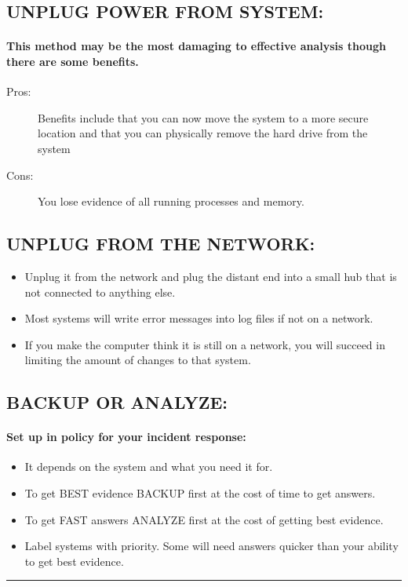 \documentclass[10pt,british,english]{article}
\begin{document}
\subsection{UNPLUG POWER FROM SYSTEM:}

\paragraph{This method may be the most damaging to effective analysis though
there are some benefits.}
\begin{description}
\item [{Pros:}] Benefits include that you can now move the system to a
more secure location and that you can physically remove the hard drive
from the system
\item [{Cons:}] You lose evidence of all running processes and memory.
\end{description}
%

\subsection{UNPLUG FROM THE NETWORK:}
\begin{itemize}
\item Unplug it from the network and plug the distant end into a small hub
that is not connected to anything else.
\item Most systems will write error messages into log files if not on a
network. 
\item If you make the computer think it is still on a network, you will
succeed in limiting the amount of changes to that system.
\end{itemize}

\subsection{BACKUP OR ANALYZE:}

\paragraph{Set up in policy for your incident response:}
\begin{itemize}
\item It depends on the system and what you need it for.
\item To get BEST evidence BACKUP first at the cost of time to get answers.
\item To get FAST answers ANALYZE first at the cost of getting best evidence.
\item Label systems with priority. Some will need answers quicker than your
ability to get best evidence.
\end{itemize}
\rule[0.5ex]{1\columnwidth}{1pt}
\end{document}
